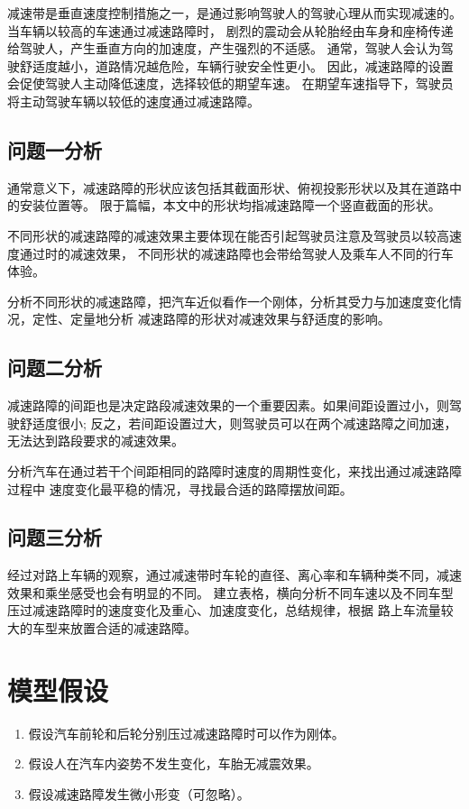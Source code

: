 \documentclass[withoutpreface,bwprint]{cumcmthesis}
\begin{document}
减速带是垂直速度控制措施之一，是通过影响驾驶人的驾驶心理从而实现减速的。当车辆以较高的车速通过减速路障时，
剧烈的震动会从轮胎经由车身和座椅传递给驾驶人，产生垂直方向的加速度，产生强烈的不适感。
通常，驾驶人会认为驾驶舒适度越小，道路情况越危险，车辆行驶安全性更小。
因此，减速路障的设置会促使驾驶人主动降低速度，选择较低的期望车速。
在期望车速指导下，驾驶员将主动驾驶车辆以较低的速度通过减速路障。

\subsection{问题一分析}

通常意义下，减速路障的形状应该包括其截面形状、俯视投影形状以及其在道路中的安装位置等。
限于篇幅，本文中的形状均指减速路障一个竖直截面的形状。

不同形状的减速路障的减速效果主要体现在能否引起驾驶员注意及驾驶员以较高速度通过时的减速效果，
不同形状的减速路障也会带给驾驶人及乘车人不同的行车体验。

分析不同形状的减速路障，把汽车近似看作一个刚体，分析其受力与加速度变化情况，定性、定量地分析
减速路障的形状对减速效果与舒适度的影响。

\subsection{问题二分析}

减速路障的间距也是决定路段减速效果的一个重要因素。如果间距设置过小，则驾驶舒适度很小;
反之，若间距设置过大，则驾驶员可以在两个减速路障之间加速，无法达到路段要求的减速效果。

分析汽车在通过若干个间距相同的路障时速度的周期性变化，来找出通过减速路障过程中
速度变化最平稳的情况，寻找最合适的路障摆放间距。

\subsection{问题三分析}

经过对路上车辆的观察，通过减速带时车轮的直径、离心率和车辆种类不同，减速效果和乘坐感受也会有明显的不同。
建立表格，横向分析不同车速以及不同车型压过减速路障时的速度变化及重心、加速度变化，总结规律，根据
路上车流量较大的车型来放置合适的减速路障。

\section{模型假设}

\begin{enumerate}

\item 假设汽车前轮和后轮分别压过减速路障时可以作为刚体。%

\item 假设人在汽车内姿势不发生变化，车胎无减震效果。

\item 假设减速路障发生微小形变（可忽略）。

\end{enumerate}
\end{document}
